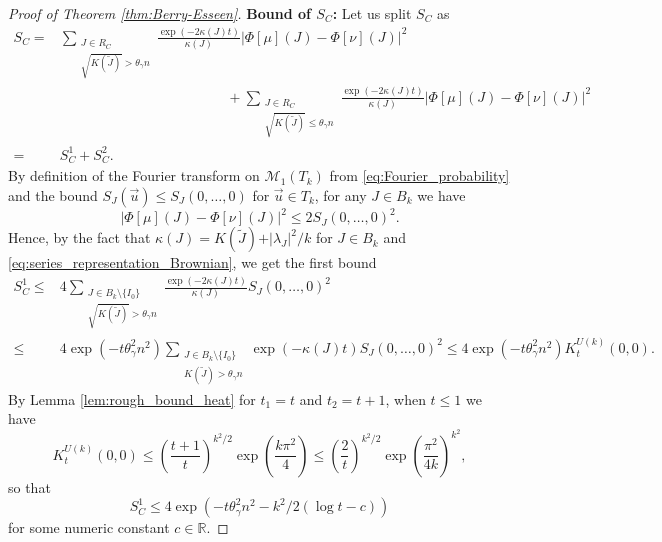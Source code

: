 \documentclass[10pt,11pt]{amsart}%
\begin{document}
\begin{proof}[Proof of Theorem \ref{thm:Berry-Esseen}]
\textbf{Bound of $S_C$:} 
Let us split $S_C$ as 
\begin{align*}
S_C=&\sum_{\substack{J\in R_C\\\sqrt{K(\tilde{J})}>\theta_{\gamma} n}}\frac{\exp(-2\kappa(J)t)}{\kappa(J)}\left\vert \Phi[\mu](J)-\Phi[\nu](J)\right\vert^2\\
&\hspace{5cm}+\sum_{\substack{J\in R_C\\\sqrt{K(\tilde{J})}\leq \theta_{\gamma} n}}\frac{\exp(-2\kappa(J)t)}{\kappa(J)}\left\vert \Phi[\mu](J)-\Phi[\nu](J)\right\vert^2\\
=&S_C^1+S_C^2.
\end{align*}
By definition of the Fourier transform on $\mathcal{M}_1(T_k)$ from \eqref{eq:Fourier_probability} and the bound $S_{J}(\vec{u})\leq S_{J}(0,\ldots,0)$ for $\vec{u}\in T_k$, for any $J\in B_{k}$ we have 
$$\left\vert \Phi[\mu](J)-\Phi[\nu](J)\right\vert^2\leq 2S_J(0,\ldots,0)^2.$$
Hence, by the fact that $\kappa(J)=K(\tilde{J})+\vert \lambda_J\vert^2/k$ for $J\in B_{k}$ and \eqref{eq:series_representation_Brownian}, we get the first bound
\begin{align*}
S_C^1\leq &4\sum_{\substack{J\in B_{k}\setminus\{I_0\}\\\sqrt{K(\tilde{J})}>\theta_{\gamma} n}}\frac{\exp(-2\kappa(J)t)}{\kappa(J)}S_J(0,\ldots,0)^2\\
\leq& 4\exp(-t\theta_{\gamma}^2n^2)\sum_{\substack{J\in B_{k}\setminus\{I_0\}\\K(\tilde{J})>\theta_{\gamma} n}}\exp(-\kappa(J)t)S_J(0,\ldots,0)^2\leq 4\exp\left(-t\theta_{\gamma}^2 n^2\right)K_{t}^{U(k)}(0,0).
\end{align*}
By Lemma \ref{lem:rough_bound_heat} for $t_1=t$ and $t_2=t+1$, when $t\leq 1$ we have
$$K_{t}^{U(k)}(0,0)\leq \left(\frac{t+1}{t}\right)^{k^2/2}\exp\left(\frac{k\pi^2}{4}\right)\leq \left(\frac{2}{t}\right)^{k^2/2}\exp\left(\frac{\pi^2}{4k}\right)^{k^2},$$
so that 
\begin{equation}\label{eq:bound_S_C_1}
S_C^1\leq 4\exp(-t\theta_{\gamma}^2 n^2-k^2/2(\log t-c))
\end{equation}
for some numeric constant $c\in \mathbb{R}$. 


\end{proof}
\end{document}
